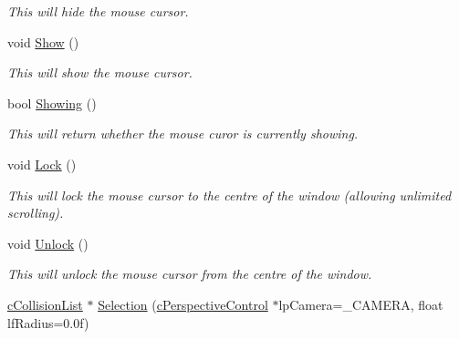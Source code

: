 \begin{DoxyCompactItemize}
\begin{DoxyCompactList}\small\item\em This will hide the mouse cursor. \end{DoxyCompactList}\item 
\hypertarget{classc_mouse_a54300b8fe1f8c5c0ec88e7ae26eff0e0}{
void \hyperlink{classc_mouse_a54300b8fe1f8c5c0ec88e7ae26eff0e0}{Show} ()}
\label{classc_mouse_a54300b8fe1f8c5c0ec88e7ae26eff0e0}

\begin{DoxyCompactList}\small\item\em This will show the mouse cursor. \end{DoxyCompactList}\item 
\hypertarget{classc_mouse_a2653fbbb900967fda6eccf933019ab8d}{
bool \hyperlink{classc_mouse_a2653fbbb900967fda6eccf933019ab8d}{Showing} ()}
\label{classc_mouse_a2653fbbb900967fda6eccf933019ab8d}

\begin{DoxyCompactList}\small\item\em This will return whether the mouse curor is currently showing. \end{DoxyCompactList}\item 
\hypertarget{classc_mouse_abef74e9066d916ec62daf4a440dbbe58}{
void \hyperlink{classc_mouse_abef74e9066d916ec62daf4a440dbbe58}{Lock} ()}
\label{classc_mouse_abef74e9066d916ec62daf4a440dbbe58}

\begin{DoxyCompactList}\small\item\em This will lock the mouse cursor to the centre of the window (allowing unlimited scrolling). \end{DoxyCompactList}\item 
\hypertarget{classc_mouse_a869bb420067947a30b57ad649e3f1f14}{
void \hyperlink{classc_mouse_a869bb420067947a30b57ad649e3f1f14}{Unlock} ()}
\label{classc_mouse_a869bb420067947a30b57ad649e3f1f14}

\begin{DoxyCompactList}\small\item\em This will unlock the mouse cursor from the centre of the window. \end{DoxyCompactList}\item 
\hypertarget{classc_mouse_a2a3632592810662e9ab868eba250b7cd}{
\hyperlink{classc_collision_list}{cCollisionList} $\ast$ \hyperlink{classc_mouse_a2a3632592810662e9ab868eba250b7cd}{Selection} (\hyperlink{classc_perspective_control}{cPerspectiveControl} $\ast$lpCamera=\_\-CAMERA, float lfRadius=0.0f)}
\label{classc_mouse_a2a3632592810662e9ab868eba250b7cd}


\end{DoxyCompactItemize}
